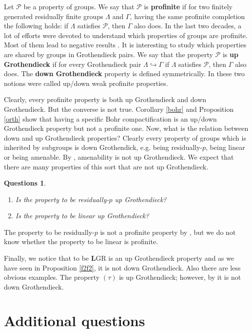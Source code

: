 \documentclass{amsart}
\newtheorem{Questions}[Conj]{Questions}
\theoremstyle{definition}
\theoremstyle{remark}
\begin{document}
 Let $\mathcal P$ be a property of groups. We say that $\mathcal P$ is {\bf profinite} if for two finitely generated residually finite groups $\Lambda$ and $\Gamma$, 
 having the same profinite completion  the following holds: if $\Lambda$  satisfies $\mathcal P$, then $\Gamma$ also does.
In the last two decades, a lot of efforts were devoted to understand which properties of groups are profinite. Most of them lead to 
negative results  \cite{Ak12, Lu14, KKRS20,  KS23, Br23, EK23}. It is interesting to study which properties are shared by groups in Grothendieck pairs. We say that the property $\mathcal P$ is {\bf  up Grothendieck} if for every Grothendieck pair $\Lambda \hookrightarrow \Gamma$  if $\Lambda$  satisfies $\mathcal P$, then $\Gamma$ also does. The {\bf  down Grothendieck} property is defined symmetrically. In \cite{CB13} these two notions were called up/down weak profinite properties.

Clearly, every profinite property is both  up Grothendieck and  down Grothendieck. But the converse is not true. Corollary \ref{bohr} and Proposition \ref{orth} show that having a specific Bohr compactification is an   up/down  Grothendieck property but not a profinite one. Now, what is the relation between  down and up Grothendieck   properties?  Clearly every property of groups which is inherited by subgroups is down  Grothendick, e.g.   being  residually-$p$,  being  linear or being amenable. By \cite[Theorem 10.2]{KS23}, amenability is not  up Grothendieck. We expect that there are many properties of this sort that are not  up Grothendieck.
\begin{Questions}\
\begin{enumerate}
\item[(a)]
Is the property to be residually-$p$   up Grothendieck? 
\item [(b)]
Is the property to be linear   up Grothendieck? 
\end{enumerate}
\end{Questions}
The property to be residually-$p$ is not a profinite property by \cite{Lu14}, but we do not know whether the property to be linear is profinite. 

Finally, we notice that to be {\bf L}GR is an   up Grothendieck property and as we have seen in Proposition \ref{f2f2}, it is  not   down Grothendieck. Also there are less obvious examples. The property $(\tau)$ is    up Grothendieck; however, by \cite[Theorem 10.2]{KS23} it is not   down Grothendieck.

 
\section{Additional questions}
\end{document}

